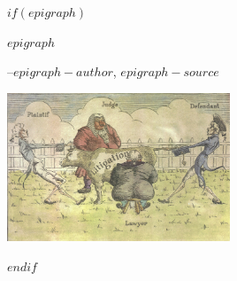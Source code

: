 $if(epigraph)$
\epigraph{$epigraph$}{--$epigraph-author$, \textit{$epigraph-source$}}
\vspace*{\fill}
\begin{fullwidth}
\begin{center}
    \includegraphics[width=0.50\textwidth]{img/litigation.png}
\end{center}
\end{fullwidth}
$endif$